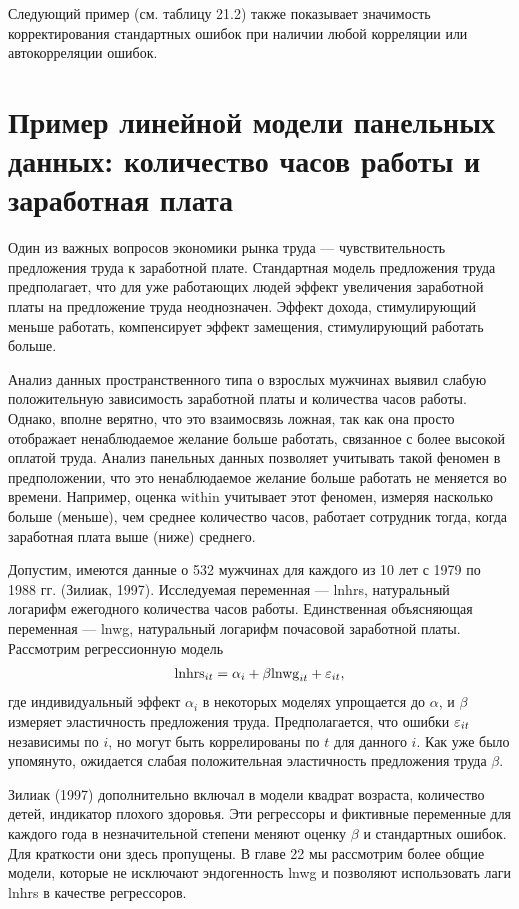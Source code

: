 Следующий пример (см. таблицу 21.2) также показывает значимость корректирования стандартных ошибок при наличии любой корреляции или автокорреляции ошибок.

\section{Пример линейной модели панельных данных: количество часов работы и заработная плата}

Один из важных вопросов экономики рынка труда  --- чувствительность предложения труда к заработной плате. Стандартная модель предложения труда предполагает, что для уже работающих людей эффект увеличения заработной платы на предложение труда неоднозначен. Эффект дохода, стимулирующий меньше работать, компенсирует эффект замещения, стимулирующий работать больше.

Анализ данных пространственного типа о взрослых мужчинах выявил слабую положительную зависимость заработной платы и количества часов работы. Однако, вполне верятно, что это взаимосвязь ложная, так как она просто отображает ненаблюдаемое желание больше работать, связанное с более высокой оплатой труда. Анализ панельных данных позволяет учитывать такой феномен в предположении, что это ненаблюдаемое желание больше работать не меняется во времени. Например, оценка within учитывает этот феномен, измеряя насколько больше (меньше), чем среднее количество часов, работает сотрудник тогда, когда заработная плата выше (ниже) среднего.

Допустим, имеются данные о 532 мужчинах для каждого из 10 лет с 1979 по 1988 гг. (Зилиак, 1997). Исследуемая переменная --- lnhrs, натуральный логарифм ежегодного количества часов работы. Единственная объясняющая переменная --- lnwg, натуральный логарифм почасовой заработной платы. Рассмотрим регрессионную модель
\begin{align}
\mathrm {lnhrs}_{it}=\alpha_i +\beta \mathrm {lnwg}_{it}+\varepsilon_{it},
\nonumber
\end{align}
где индивидуальный эффект $\alpha_i$ в некоторых моделях упрощается до $\alpha$, и $\beta$ измеряет эластичность предложения труда. Предполагается, что ошибки $\varepsilon_{it}$ независимы по $i$, но могут быть коррелированы по $t$ для данного $i$. Как уже было упомянуто, ожидается слабая положительная эластичность предложения труда $\beta$.

Зилиак (1997) дополнительно включал в модели квадрат возраста, количество детей, индикатор плохого здоровья. Эти регрессоры и фиктивные переменные для каждого года в незначительной степени меняют оценку $\beta$ и стандартных ошибок. Для краткости они здесь пропущены. В главе 22 мы рассмотрим более общие модели, которые не исключают эндогенность lnwg и позволяют использовать лаги lnhrs в качестве регрессоров.

